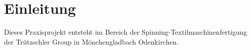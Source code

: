 \section{Einleitung}
    Dieses Praxisprojekt entsteht im Bereich der Spinning-Textilmaschinenfertigung der Trützschler Group in Mönchengladbach Odenkirchen.